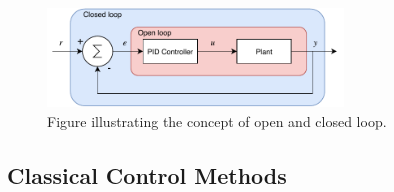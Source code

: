 \documentclass[../../main.tex]{subfiles}
\begin{document}


\begin{figure}[H]
    \centering
    \includegraphics[width=0.7\textwidth]{Sections/Miscellaneous/Images/Open_closed_Diagram.pdf}
    \caption{Figure illustrating the concept of open and closed loop. }
    \label{fig:Open_Close_loop}
\end{figure}





\subsection*{Classical Control Methods}

\end{document}
